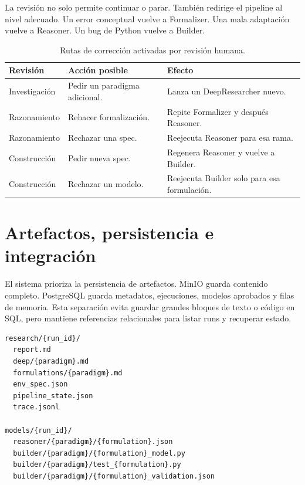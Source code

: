La revisión no solo permite continuar o parar. También redirige el pipeline al
nivel adecuado. Un error conceptual vuelve a Formalizer. Una mala adaptación
vuelve a Reasoner. Un bug de Python vuelve a Builder.

\begin{table}[H]
\begin{center}
\small
\begin{tabular}{|p{3.5cm}|p{4.4cm}|p{4.5cm}|} \hline
\textbf{Revisión} & \textbf{Acción posible} & \textbf{Efecto} \\ \hline
Investigación & Pedir un paradigma adicional. & Lanza un DeepResearcher nuevo. \\ \hline
Razonamiento & Rehacer formalización. & Repite Formalizer y después Reasoner. \\ \hline
Razonamiento & Rechazar una spec. & Reejecuta Reasoner para esa rama. \\ \hline
Construcción & Pedir nueva spec. & Regenera Reasoner y vuelve a Builder. \\ \hline
Construcción & Rechazar un modelo. & Reejecuta Builder solo para esa formulación. \\ \hline
\end{tabular}
\caption{Rutas de corrección activadas por revisión humana.}
\end{center}
\end{table}

\section{Artefactos, persistencia e integración}

El sistema prioriza la persistencia de artefactos. MinIO guarda contenido
completo. PostgreSQL guarda metadatos, ejecuciones, modelos aprobados y filas
de memoria. Esta separación evita guardar grandes bloques de texto o código en
SQL, pero mantiene referencias relacionales para listar runs y recuperar
estado.

\begin{verbatim}
research/{run_id}/
  report.md
  deep/{paradigm}.md
  formulations/{paradigm}.md
  env_spec.json
  pipeline_state.json
  trace.jsonl

models/{run_id}/
  reasoner/{paradigm}/{formulation}.json
  builder/{paradigm}/{formulation}_model.py
  builder/{paradigm}/test_{formulation}.py
  builder/{paradigm}/{formulation}_validation.json
\end{verbatim}

